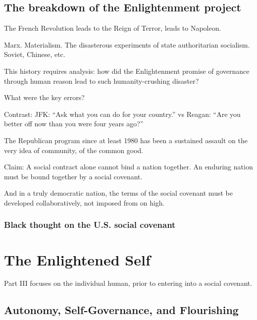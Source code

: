 \documentclass[
]{book}
\begin{document}
\hypertarget{the-breakdown-of-the-enlightenment-project}{%
\chapter{The breakdown of the Enlightenment project}\label{the-breakdown-of-the-enlightenment-project}}

The French Revolution leads to the Reign of Terror, leads to Napoleon.

Marx. Materialism. The disasterous experiments of state authoritarian socialism. Soviet, Chinese, etc.

This history requires analysis: how did the Enlightenment promise of governance through human reason lead to such humanity-crushing disaster?

What were the key errors?

Contrast:
JFK: ``Ask what you can do for your country.''
vs Reagan: ``Are you better off now than you were four years ago?''

The Republican program since at least 1980 has been a sustained assault on the very idea of community, of the common good.

Claim: A social contract alone cannot bind a nation together. An enduring nation must be bound together by a social covenant.

And in a truly democratic nation, the terms of the social covenant must be developed collaboratively, not imposed from on high.

\hypertarget{black-thought-on-the-u.s.-social-covenant}{%
\section{Black thought on the U.S. social covenant}\label{black-thought-on-the-u.s.-social-covenant}}

\hypertarget{part-the-enlightened-self}{%
\part{The Enlightened Self}\label{part-the-enlightened-self}}

Part III focuses on the individual human, prior to entering into a social covenant.

\hypertarget{autonomy-self-governance-and-flourishing}{%
\chapter{Autonomy, Self-Governance, and Flourishing}\label{autonomy-self-governance-and-flourishing}}
\end{document}
